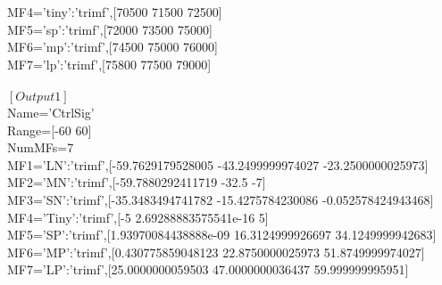 MF4='tiny':'trimf',[70500 71500 72500]\\
MF5='sp':'trimf',[72000 73500 75000]\\
MF6='mp':'trimf',[74500 75000 76000]\\
MF7='lp':'trimf',[75800 77500 79000]\\
\\
$ [Output1] $\\
Name='CtrlSig'\\
Range=[-60 60]\\
NumMFs=7\\
MF1='LN':'trimf',[-59.7629179528005 -43.2499999974027 -23.2500000025973]\\
MF2='MN':'trimf',[-59.7880292411719 -32.5 -7]\\
MF3='SN':'trimf',[-35.3483494741782 -15.4275784230086 -0.052578424943468]\\
MF4='Tiny':'trimf',[-5 2.69288883575541e-16 5]\\
MF5='SP':'trimf',[1.93970084438888e-09 16.3124999926697 34.1249999942683]\\
MF6='MP':'trimf',[0.430775859048123 22.8750000025973 51.8749999974027]\\
MF7='LP':'trimf',[25.0000000059503 47.0000000036437 59.999999995951]\\
\\
